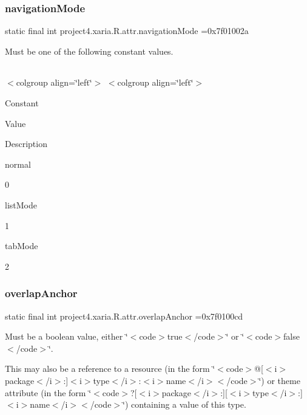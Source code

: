 \subsubsection{\texorpdfstring{navigation\+Mode}{navigationMode}}
{\footnotesize\ttfamily static final int project4.\+xaria.\+R.\+attr.\+navigation\+Mode =0x7f01002a\hspace{0.3cm}{\ttfamily [static]}}

Must be one of the following constant values.

\tabulinesep=1mm
\begin{longtabu} spread 0pt [c]{*{0}{|X[-1]}|}
\hline
\end{longtabu}
$<$colgroup align=\char`\"{}left\char`\"{}$>$ $<$colgroup align=\char`\"{}left\char`\"{}$>$ 

Constant

Value

Description 

{\ttfamily normal}

0

{\ttfamily list\+Mode}

1

{\ttfamily tab\+Mode}

2\mbox{\label{classproject4_1_1xaria_1_1R_1_1attr_a8192eab207fc35ad8f69f40598458cd0}} 
\subsubsection{\texorpdfstring{overlap\+Anchor}{overlapAnchor}}
{\footnotesize\ttfamily static final int project4.\+xaria.\+R.\+attr.\+overlap\+Anchor =0x7f0100cd\hspace{0.3cm}{\ttfamily [static]}}

Must be a boolean value, either \char`\"{}$<$code$>$true$<$/code$>$\char`\"{} or \char`\"{}$<$code$>$false$<$/code$>$\char`\"{}. 

This may also be a reference to a resource (in the form \char`\"{}$<$code$>$@\mbox{[}$<$i$>$package$<$/i$>$\+:\mbox{]}$<$i$>$type$<$/i$>$\+:$<$i$>$name$<$/i$>$$<$/code$>$\char`\"{}) or theme attribute (in the form \char`\"{}$<$code$>$?\mbox{[}$<$i$>$package$<$/i$>$\+:\mbox{]}\mbox{[}$<$i$>$type$<$/i$>$\+:\mbox{]}$<$i$>$name$<$/i$>$$<$/code$>$\char`\"{}) containing a value of this type. \mbox{\label{classproject4_1_1xaria_1_1R_1_1attr_af415a51e10ea1086aae8207a041fe5f2}} 

